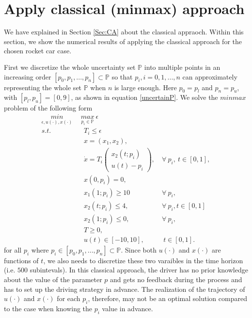 \documentclass  [
  paper    = a4,
  BCOR     = 10mm,
  twoside,
  fontsize = 12pt,
  fleqn,
  toc      = bibnumbered,
  toc      = listofnumbered,
  numbers  = noendperiod,
  headings = normal,
  listof   = leveldown,
  version  = 3.03
]                                       {scrreprt}
\newcommand{\<}{\langle}
\renewcommand{\>}{\rangle}
\begin{document}
\section{Apply classical (minmax) approach}
We have explained in Section \ref{Sec:CA} about the classical appraoch. Within this section, we show the numerical results of applying the classical approach for the chosen rocket car case. 

First we discretize the whole uncertainty set  $\mathbb{P}$ into multiple points in an increasing order $[p_0, p_1, ..., p_n] \subset \mathbb{P}$ so that $p_i, i =0, 1, ..., n$ can approximately representing the whole set $\mathbb{P}$ when $n$ is large enough. Here $p_0=p_l$ and $p_n= p_u$, with $[p_l, p_u] =[0,9]$, as shown in equation \ref{uncertainP}.  We solve the $minmax$ problem of the following form
\begin{subequations}
	\begin{align}
		\underset{\epsilon, u(\cdot), x(\cdot)}{min}  \ \   &  \underset{p_i \in \mathbb{P}}{max}  \  \epsilon \\ 
		s.t.  &  \ \ T_i  \leq \epsilon \\
		&  \ \ x = (x_1, x_2),   \label{ca_rc_x} \\ 
		& \ \  \dot{x} = T_i  \begin{pmatrix}  x_2(t;p_i) \\ u(t)-p_i   \end{pmatrix}, &  \ \forall \   p_i, \  t \in [0,1],  \label{ca_rc_partial} \\
		& \ \ x(0,p_i) = 0, \label{ca_rc_t0}\\
		& \ \ x_1(1;p_i) \geq 10  & \ \forall \   p_i,   \label{ca_rc_x1_t1} \\
		& \ \ x_2(t;p_i) \leq 4, &   \ \forall \   p_i,  t \in [0,1] \label{ca_rc_x2_tc} \\
		& \ \ x_2(1;p_i) \leq 0,   & \ \forall \   p_i,  \label{ca_rc_x2_t1}  \\
		& \ \ T \geq 0, \\
		& \ \ u(t) \in [-10, 10], & \ \ t \in [0,1]. 
	\end{align}
	\label{ca_rc}
\end{subequations}
for all $p_i$ where $p_i \in [p_0, p_1, ..., p_n] \subset \mathbb{P}$. Since both $u(\cdot)$ and $x(\cdot)$ are functions of $t$, we also needs to discretize these two varaibles in the time horizon (i.e. $500$ subintevals). In this classical approach, the driver has no prior knowledge about the value of the parameter $p$ and gets no feedback during the process and has to set up the driving strategy in advance. The realization of the trajectory of $u(\cdot)$ and $x(\cdot)$ for each $p_i$, therefore, may not be an optimal solution compared to the case when knowing the $p_i$ value in advance.
\end{document}
